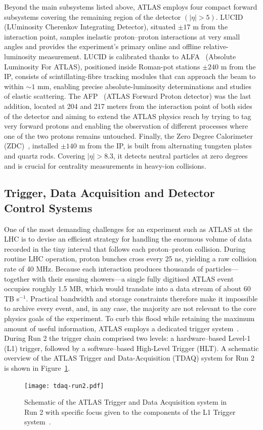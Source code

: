 Beyond the main subsystems listed above, ATLAS employs four compact forward subsystems covering the remaining region of the detector $(|\eta| > 5)$.
LUCID~\cite{Jenni:721908} (LUminosity Cherenkov Integrating Detector), situated $\pm17$ m from the interaction point, samples inelastic proton–proton interactions at very small angles and provides the experiment’s primary online and offline relative-luminosity measurement.  
LUCID is calibrated thanks to ALFA~\cite{Khalek_2016} (Absolute Luminosity For ATLAS), positioned inside Roman-pot stations $\pm240$ m from the IP, consists of scintillating-fibre tracking modules that can approach the beam to within $\sim\!1$ mm, enabling precise absolute-luminosity determinations and studies of elastic scattering.  
The AFP~\cite{Adamczyk:2015cjy} (ATLAS Forward Proton detector) was the last addition, located at 204 and 217 meters from the interaction point of both sides of the detector and aiming to extend the ATLAS physics reach by trying to tag very forward protons and enabling the observation of different processes where one of the two protons remains untouched.
Finally, the Zero Degree Calorimeter (ZDC)~\cite{Jenni:1009649}, installed $\pm140$ m from the IP, is built from alternating tungsten plates and quartz rods.  Covering $|\eta| > 8.3$, it detects neutral particles at zero degrees and is crucial for centrality measurements in heavy-ion collisions.

\subsection{Trigger, Data Acquisition and Detector Control Systems}
\label{sec:trigger}
One of the most demanding challenges for an experiment such as ATLAS at the LHC is to devise an efficient strategy for handling the enormous volume of data recorded in the tiny interval that follows each proton–proton collision. During routine LHC operation, proton bunches cross every 25 ns, yielding a raw collision rate of 40 MHz. Because each interaction produces thousands of particles—together with their ensuing showers—a single fully digitised ATLAS event occupies roughly 1.5 MB, which would translate into a data stream of about 60 TB s$^{-1}$. Practical bandwidth and storage constraints therefore make it impossible to archive every event, and, in any case, the majority are not relevant to the core physics goals of the experiment. To curb this flood while retaining the maximum amount of useful information, ATLAS employs a dedicated trigger system~\cite{trigger_run2}. During Run 2 the trigger chain comprised two levels: a hardware–based Level-1 (L1) trigger, followed by a software–based High-Level Trigger (HLT). A schematic overview of the ATLAS Trigger and Data-Acquisition (TDAQ) system for Run 2 is shown in Figure~\ref{fig:trigger_system}.
\begin{figure}[htbp]
    \centering
        \texttt{[image: tdaq-run2.pdf]}
    \caption{Schematic of the ATLAS Trigger and Data Acquisition system in Run 2 with specific focus given to the components of the L1 Trigger system~\cite{atlas_daq_run2}.}
    \label{fig:trigger_system}
\end{figure}

